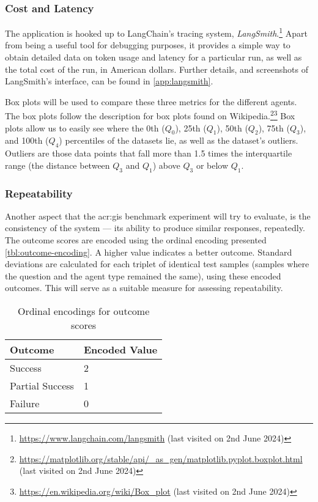 \subsubsection{Cost and Latency}
\label{subsubsec:cost-and-duration}

The application is hooked up to LangChain's tracing system, \textit{LangSmith}.\footnote{\url{https://www.langchain.com/langsmith} (last visited on 2nd June 2024)} Apart from being a useful tool for debugging purposes, it provides a simple way to obtain detailed data on token usage and latency for a particular run, as well as the total cost of the run, in American dollars. Further details, and screenshots of LangSmith's interface, can be found in \autoref{app:langsmith}.

Box plots will be used to compare these three metrics for the different agents. The box plots follow the description for box plots found on Wikipedia.\footnote{\url{https://matplotlib.org/stable/api/_as_gen/matplotlib.pyplot.boxplot.html} (last visited on 2nd June 2024)}\footnote{\url{https://en.wikipedia.org/wiki/Box_plot} (last visited on 2nd June 2024)} Box plots allow us to easily see where the 0th ($Q_0$), 25th ($Q_1$), 50th ($Q_2$), 75th ($Q_3$), and 100th ($Q_4$) percentiles of the datasets lie, as well as the dataset's outliers. Outliers are those data points that fall more than 1.5 times the interquartile range (the distance between $Q_3$ and $Q_1$) above $Q_3$ or below $Q_1$.

\subsubsection{Repeatability}
\label{subsubsec:repeatability}

Another aspect that the \acrshort{acr:gis} benchmark experiment will try to evaluate, is the consistency of the system --- its ability to produce similar responses, repeatedly. The outcome scores are encoded using the ordinal encoding presented \autoref{tbl:outcome-encoding}. A higher value indicates a better outcome. Standard deviations are calculated for each triplet of identical test samples (samples where the question and the agent type remained the same), using these encoded outcomes. This will serve as a suitable measure for assessing repeatability.

\begin{table}[htbp]
    \centering
    \caption{Ordinal encodings for outcome scores}
    \label{tbl:outcome-encoding}
    \begin{tabularx}{0.5\textwidth}{XX}
        \toprule
        \textbf{Outcome} & \textbf{Encoded Value} \\
        \midrule
        Success          & 2                      \\
        Partial Success  & 1                      \\
        Failure          & 0                      \\
        \bottomrule
    \end{tabularx}
\end{table}


